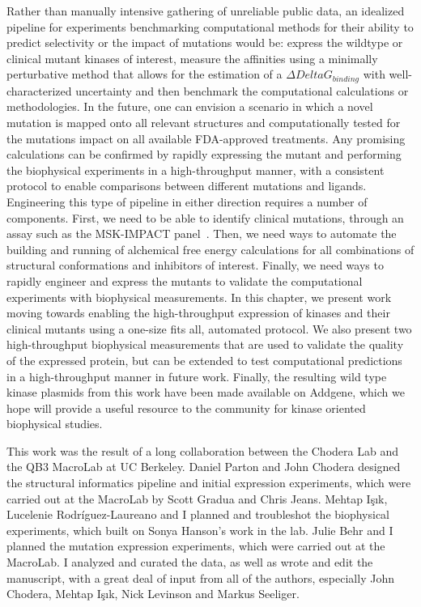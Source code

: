 \documentclass[phd,tocprelim]{cornell}
\begin{document}
Rather than manually intensive gathering of unreliable public data, an idealized pipeline for experiments benchmarking computational methods for their ability to predict selectivity or the impact of mutations would be: express the wildtype or clinical mutant kinases of interest, measure the affinities using a minimally perturbative method that allows for the estimation of a $\Delta Delta G_{binding}$ with well-characterized uncertainty and then benchmark the computational calculations or methodologies. In the future, one can envision a scenario in which a novel mutation is mapped onto all relevant structures and computationally tested for the mutations impact on all available FDA-approved treatments. Any promising calculations can be confirmed by rapidly expressing the mutant and performing the biophysical experiments in a high-throughput manner, with a consistent protocol to enable comparisons between different mutations and ligands. Engineering this type of pipeline in either direction requires a number of components. First, we need to be able to identify clinical mutations, through an assay such as the MSK-IMPACT panel~\citep{Zehir:2017ib}. Then, we need ways to automate the building and running of alchemical free energy calculations for all combinations of structural conformations and inhibitors of interest. Finally, we need ways to rapidly engineer and express the mutants to validate the computational experiments with biophysical measurements. In this chapter, we present work moving towards enabling the high-throughput expression of kinases and their clinical mutants using a one-size fits all, automated protocol. We also present two high-throughput biophysical measurements that are used to validate the quality of the expressed protein, but can be extended to test computational predictions in a high-throughput manner in future work. Finally, the resulting wild type kinase plasmids from this work have been made available on Addgene, which we hope will provide a useful resource to the community for kinase oriented biophysical studies. 

This work was the result of a long collaboration between the Chodera Lab and the QB3 MacroLab at UC Berkeley. Daniel Parton and John Chodera designed the structural informatics pipeline and initial expression experiments, which were carried out at the MacroLab by Scott Gradua and Chris Jeans. Mehtap Işık, Lucelenie Rodr\'{i}guez-Laureano and I planned and troubleshot the biophysical experiments, which built on Sonya Hanson's work in the lab. Julie Behr and I planned the mutation expression experiments, which were carried out at the MacroLab. I analyzed and curated the data, as well as wrote and edit the manuscript, with a great deal of input from all of the authors, especially John Chodera, Mehtap Işık, Nick Levinson and Markus Seeliger. 
\end{document}
